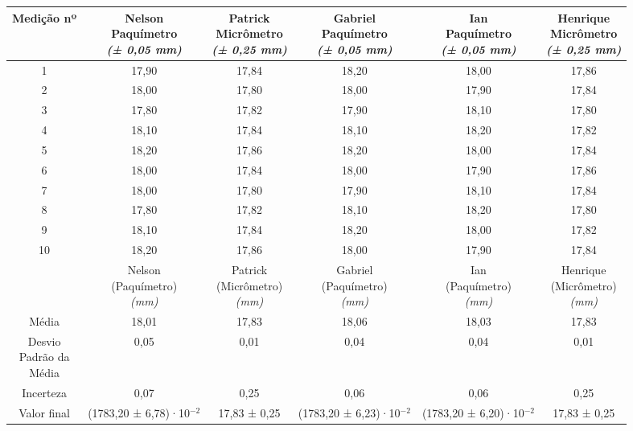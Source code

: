\documentclass{article}
\begin{document}
\begin{table}[h!]
\centering
\begin{tabular}{c c c c c c }
\toprule
Medição nº & \shortstack{Nelson\\Paquímetro\\\textit{(± 0,05 mm)}} & \shortstack{Patrick\\Micrômetro\\\textit{(± 0,25 mm)}} & \shortstack{Gabriel\\Paquímetro\\\textit{(± 0,05 mm)}} & \shortstack{Ian\\Paquímetro\\\textit{(± 0,05 mm)}} & \shortstack{Henrique\\Micrômetro\\\textit{(± 0,25 mm)}}\\
\midrule
1 & 17,90 & 17,84 & 18,20 & 18,00 & 17,86\\
2 & 18,00 & 17,80 & 18,00 & 17,90 & 17,84\\
3 & 17,80 & 17,82 & 17,90 & 18,10 & 17,80\\
4 & 18,10 & 17,84 & 18,10 & 18,20 & 17,82\\
5 & 18,20 & 17,86 & 18,20 & 18,00 & 17,84\\
6 & 18,00 & 17,84 & 18,00 & 17,90 & 17,86\\
7 & 18,00 & 17,80 & 17,90 & 18,10 & 17,84\\
8 & 17,80 & 17,82 & 18,10 & 18,20 & 17,80\\
9 & 18,10 & 17,84 & 18,20 & 18,00 & 17,82\\
10 & 18,20 & 17,86 & 18,00 & 17,90 & 17,84\\
\midrule
&\shortstack{Nelson\\(Paquímetro)\\\textit{(mm)}} & \shortstack{Patrick\\(Micrômetro)\\\textit{(mm)}} & \shortstack{Gabriel\\(Paquímetro)\\\textit{(mm)}} & \shortstack{Ian\\(Paquímetro)\\\textit{(mm)}} & \shortstack{Henrique\\(Micrômetro)\\\textit{(mm)}}\\
\midrule
Média & 18,01 & 17,83 & 18,06 & 18,03 & 17,83\\[3pt]
\shortstack{Desvio\\Padrão da\\Média} & 0,05 & 0,01 & 0,04 & 0,04 & 0,01\\[3pt]
Incerteza & 0,07 & 0,25 & 0,06 & 0,06 & 0,25\\[3pt]
Valor final & (1783,20 ± 6,78)·10$^{-2}$ & 17,83 ± 0,25 & (1783,20 ± 6,23)·10$^{-2}$ & (1783,20 ± 6,20)·10$^{-2}$ & 17,83 ± 0,25\\[3pt]
\bottomrule
\end{tabular}
\end{table}
\end{document}
